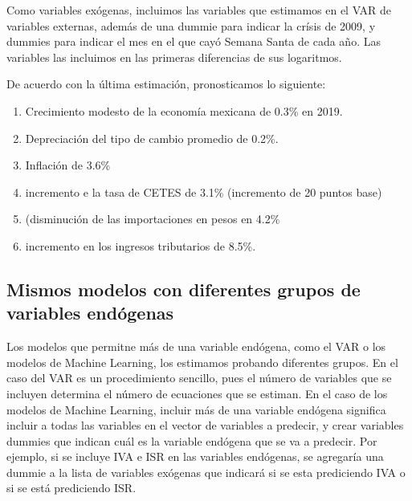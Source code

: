 \documentclass[a4paper, 11pt]{article}
\begin{document}
\begin{enumerate}
Como variables exógenas, incluimos las variables que estimamos en el VAR de variables externas, además de una dummie para indicar la crísis de 2009, y dummies para indicar el mes en el que cayó Semana Santa de cada año. Las variables las incluimos en las primeras diferencias de sus logaritmos. 

De acuerdo con la última estimación, pronosticamos lo siguiente:
\begin{enumerate}
\item Crecimiento modesto de la economía mexicana de 0.3\% en 2019.
\item Depreciación del tipo de cambio promedio de 0.2\%.
\item Inflación de 3.6\%
\item incremento e la tasa de CETES de 3.1\%  (incremento de 20 puntos base)
\item (disminución de las importaciones en pesos en 4.2\%
\item incremento en los ingresos tributarios de 8.5\%.
\end{enumerate}

\end{enumerate}


\subsection*{Mismos modelos con diferentes grupos de variables endógenas}
Los modelos que permitne más de una variable endógena, como el VAR o los modelos de Machine Learning, los estimamos probando diferentes grupos. En el caso del VAR es un procedimiento sencillo, pues el número de variables que se incluyen determina el número de ecuaciones que se estiman. En el caso de los modelos de Machine Learning, incluir más de una variable endógena significa incluir a todas las variables en el vector de variables a predecir, y crear variables dummies que indican cuál es la variable endógena que se va a predecir. Por ejemplo, si se incluye IVA e ISR en las variables endógenas, se agregaría una dummie a la lista de variables exógenas que indicará si se esta prediciendo IVA o si se está prediciendo ISR.
\end{document}
